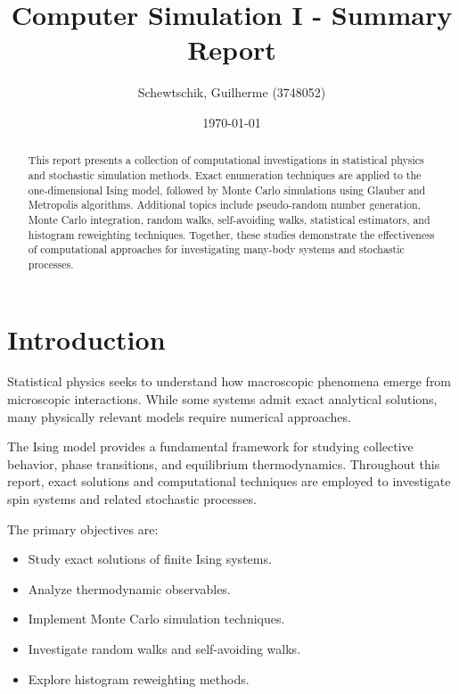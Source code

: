 \documentclass[a4paper]{article}
\title{Computer Simulation I - Summary Report}
\author{Schewtschik, Guilherme (3748052)}
\date{\today}
\begin{document}
\maketitle
\begin{abstract}

This report presents a collection of computational investigations in statistical physics and stochastic simulation methods. Exact enumeration techniques are applied to the one-dimensional Ising model, followed by Monte Carlo simulations using Glauber and Metropolis algorithms. Additional topics include pseudo-random number generation, Monte Carlo integration, random walks, self-avoiding walks, statistical estimators, and histogram reweighting techniques. Together, these studies demonstrate the effectiveness of computational approaches for investigating many-body systems and stochastic processes.

\end{abstract}

\section{Introduction}

Statistical physics seeks to understand how macroscopic phenomena emerge from microscopic interactions. While some systems admit exact analytical solutions, many physically relevant models require numerical approaches.

The Ising model provides a fundamental framework for studying collective behavior, phase transitions, and equilibrium thermodynamics. Throughout this report, exact solutions and computational techniques are employed to investigate spin systems and related stochastic processes.

The primary objectives are:

\begin{itemize}
    \item Study exact solutions of finite Ising systems.
    \item Analyze thermodynamic observables.
    \item Implement Monte Carlo simulation techniques.
    \item Investigate random walks and self-avoiding walks.
    \item Explore histogram reweighting methods.
\end{itemize}
\end{document}
